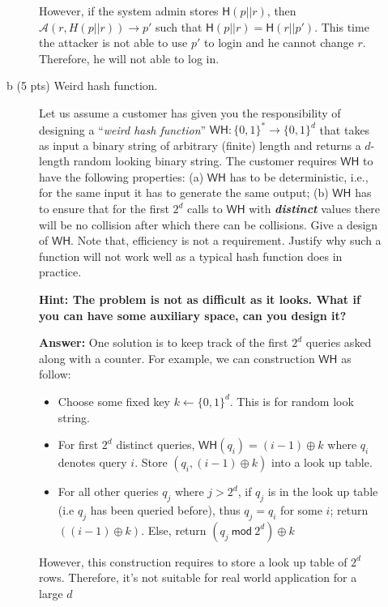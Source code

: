 \documentclass[11pt]{article}
\newcommand{\ans}[1]{\begin{mdframed}\textbf{Answer: }#1\end{mdframed}}
\begin{document}
\begin{description}
\begin{description}
{            However, if the system admin stores $\mathsf{H}(p||r)$, then $\mathcal{A}(r,H(p||r)) \rightarrow p'$ such that $\mathsf{H}(p||r)=\mathsf{H}(r||p')$. This time the attacker is not able to use $p'$ to login and he cannot change $r$. Therefore, he will not able to log in.
        }
        \item [b (5 pts) Weird hash function.] Let us assume a customer has given you the
        responsibility of designing a ``\emph{weird hash function}'' $\mathsf{WH}: \{0,1\}^*\rightarrow\{0,1\}^d$
        that takes as input a binary string of arbitrary (finite) length and returns a $d$-length random looking
        binary string. The customer requires $\mathsf{WH}$ to have the following properties:
        (a) $\mathsf{WH}$ has to be deterministic, i.e., for the same input it has to generate the same output;
        (b) $\mathsf{WH}$ has to ensure that for the first $2^d$ calls to $\mathsf{WH}$ with \emph{\bf distinct} values
        there will be no collision after which there can be collisions. Give a design of $\mathsf{WH}$.
        Note that, efficiency is not a requirement. Justify why such a function will not work well as a typical hash function does
        in practice.

        \textbf{Hint: The problem is not as difficult as it looks. What if you can have some auxiliary space, can you design it?}\\
        \ans{
            One solution is to keep track of the first $2^d$ queries asked along with a counter. 
            For example, we can construction $\mathsf{WH}$ as follow:
            \begin{itemize}
                \item Choose some fixed key $k\leftarrow \{0,1\}^d$. This is for random look string.
                \item For first $2^d$ distinct queries, $\mathsf{WH}(q_i)= (i-1) \oplus k$ where $q_i$ denotes query $i$. Store $(q_i,(i-1) \oplus k)$ into a look up table.
                \item For all other queries $q_j$ where $j>2^d$, if $q_j$ is in the look up table (i.e $q_j$ has been queried before), thus $q_j = q_i$ for some $i$; return $((i-1) \oplus k)$. Else, return $(q_j\ \mathsf{ mod }\ 2^d) \oplus k$
            \end{itemize}
            
            However, this construction requires to store a look up table of $2^d$ rows. Therefore, it's not suitable for real world application for a large $d$  
        }




\end{description}
\end{description}
\end{document}
